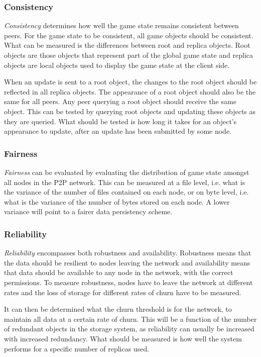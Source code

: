 \documentclass[10pt,a4paper,journal,cspaper,compsoc]{IEEEtran}
\begin{document}
\subsubsection{Consistency}
\emph{Consistency} determines how well the game state remains consistent between peers. For the game state to be consistent, all game objects should
be consistent. What can be measured is the differences between root and replica objects. Root objects are those objects that represent part of the
global game state and replica objects are local objects used to display the game state at the client side.

When an update is sent to a root object, the changes to the root object should be reflected in all replica objects. The appearance of a root object
should also be the same for all peers. Any peer querying a root object should receive the same object. This can be tested by querying root objects
and updating these objects as they are queried. What should be tested is how long it takes for an object's appearance to update, after an update has
been submitted by some node.

\subsubsection{Fairness}
\emph{Fairness} can be evaluated by evaluating the distribution of game state amongst all nodes in the P2P network. This can be measured at a file
level, i.e. what is the variance of the number of files contained on each node, or on byte level, i.e. what is the variance of the number of bytes
stored on each node. A lower variance will point to a fairer data persistency scheme.

\subsubsection{Reliability}
\emph{Reliability} encompasses both robustness and availability. Robustness means that the data should be resilient to nodes leaving the network and
availability means that data should be available to any node in the network, with the correct permissions. To measure robustness, nodes have to leave
the network at different rates and the loss of storage for different rates of churn have to be measured.

It can then be determined what the churn threshold is for the network, to maintain all data at a certain rate of churn. This will be a function of
the number of redundant objects in the storage system, as reliability can usually be increased with increased redundancy. What should be measured is
how well the system performs for a specific number of replicas used.
\end{document}
